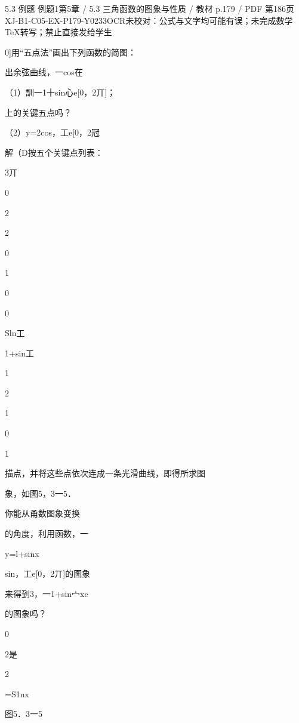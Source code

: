 \begin{bankitem}{5.3 例题 例题1}{第5章 / 5.3 三角函数的图象与性质 / 教材 p.179 / PDF 第186页}{XJ-B1-C05-EX-P179-Y0233}{OCR未校对：公式与文字均可能有误；未完成数学TeX转写；禁止直接发给学生}
\begin{ocrdraft}
\par
0]用“五点法”画出下列函数的简图：
\par
出余弦曲线，一cos在
\par
（1）訓一1十sin心e[0，2丌]；
\par
[0，2丌]上的关键五点吗？
\par
（2）y=2cos，工e[0，2冠
\par
解（D按五个关键点列表：
\par
3丌
\par
0
\par
2
\par
2
\par
0
\par
1
\par
0
\par
0
\par
Sln工
\par
1+sin工
\par
1
\par
2
\par
1
\par
0
\par
1
\par
描点，并将这些点依次连成一条光滑曲线，即得所求图
\par
象，如图5，3一5．
\par
你能从甬数图象变换
\par
的角度，利用函数，一
\par
y=l+sinx
\par
sin，工e[0，2丌]的图象
\par
来得到3，一1+sin宀xe
\par
[0，2丌]的图象吗？
\par
0
\par
2是
\par
2
\par
=S1nx
\par
图5．3一5
\par

\end{ocrdraft}
\end{bankitem}
